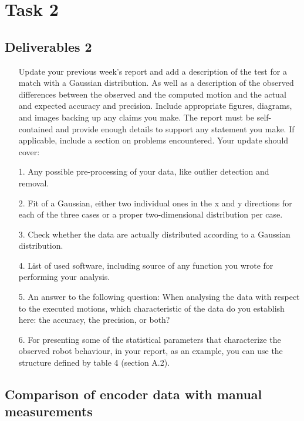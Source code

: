 
    \chapter{Task 2}
    \section{Deliverables 2}
    \begin{itemize}
        \item[] Update your previous week’s report and add a description of the test for a match with a Gaussian distribution. As well as a description of the observed differences between the observed and the computed motion and the actual and expected accuracy and precision. Include appropriate figures, diagrams, and images backing up any claims you make. The report must be self-contained and provide enough details to support any statement you make. If applicable, include a section on problems encountered. Your update should cover:
    \end{itemize}
    
    \begin{itemize}
        \item[1.] Any possible pre-processing of your data, like outlier detection and removal.
        \item[2.] Fit of a Gaussian, either two individual ones in the x and y directions for each of the three cases or a proper two-dimensional distribution per case.
        \item[3.] Check whether the data are actually distributed according to a Gaussian distribution.
        \item[4.] List of used software, including source of any function you wrote for performing your analysis.
        \item[5.] An answer to the following question: When analysing the data with respect to the executed motions, which characteristic of the data do you establish here: the accuracy, the precision, or both?
        \item[6.] For presenting some of the statistical parameters that characterize the observed robot behaviour, in your report, as an example, you can use the structure defined by table 4 (section A.2).
    \end{itemize}
    
    \section{Comparison of encoder data with manual measurements}
    
